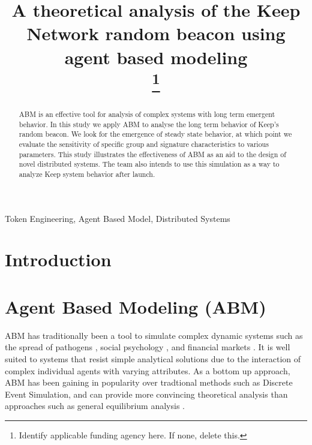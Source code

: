 \documentclass[conference]{IEEEtran}
\begin{document}
\title{A theoretical analysis of the Keep Network random beacon using agent based modeling \\
\thanks{Identify applicable funding agency here. If none, delete this.}
}

\author{

\and
{}

\and
{}

\and
{}
}

\maketitle

\begin{abstract}
    ABM is an effective tool for analysis of complex systems with long term 
    emergent behavior. In this study we apply ABM to analyse the long term 
    behavior of Keep’s random beacon. We look for the emergence of steady 
    state behavior, at which point we evaluate the sensitivity of specific 
    group and signature characteristics to various parameters. This study 
    illustrates the effectiveness of ABM as an aid to the design 
    of novel distributed systems. The team also intends to use this simulation
    as a way to analyze Keep system behavior after launch.

\end{abstract}

\begin{IEEEkeywords}
Token Engineering, Agent Based Model, Distributed Systems
\end{IEEEkeywords}

\section{Introduction}

\section{Agent Based Modeling (ABM)}
ABM has traditionally been a tool to simulate complex dynamic systems 
such as the spread of pathogens \cite{Bauer2009}, social psychology 
\cite{Smith2007}, and financial markets \cite{Feng2012}. It is well suited
to systems that resist simple analytical solutions due to the interaction of 
complex individual agents with varying attributes. As a bottom up approach, ABM
has been gaining in popularity over tradtional methods such as Discrete Event
Simulation, and can provide more convincing theoretical analysis than approaches
such as general equilibrium analysis \cite{Wang2018}.
\end{document}
